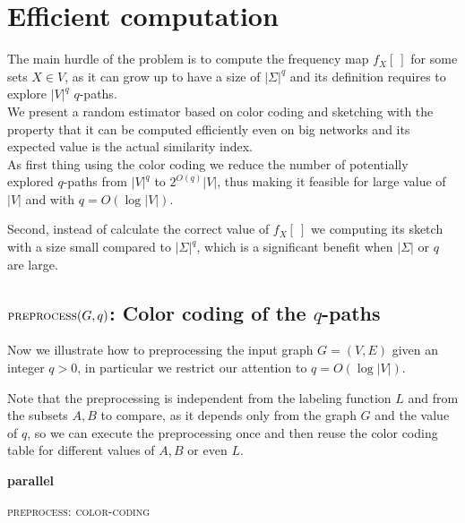 \section{Efficient computation}

The main hurdle of the problem is to compute the frequency map $f_{X}[\ ]$ for some sets $X \in V$,
as it can grow up to have a size of $|\Sigma|^{q}$ and its definition requires to explore $|V|^{q}$ $q$-paths.\\

We present a random estimator based on color coding and sketching with the property that it can be computed
efficiently even on big networks and its expected value is the actual similarity index\cite{SubSim}.\\

As first thing using the color coding we reduce the number of potentially explored $q$-paths from $|V|^{q}$ to $2^{O(q)}|V|$, 
thus making it feasible for large value of $|V|$ and with $q = O(\log |V|)$.

Second, instead of calculate the correct value of $f_{X}[\ ]$ we computing its sketch with a size small compared to $|\Sigma|^{q}$,
which is a significant benefit when $|\Sigma|$ or $q$ are large.

\subsection*{$\textsc{preprocess}(G,q)$: Color coding of the $q$-paths}

Now we illustrate how to preprocessing the input graph $G=(V,E)$ given an integer $q > 0$, in particular we restrict our attention to $q = O(\log |V|)$.

Note that the preprocessing is independent from the labeling function $L$ and from the subsets $A,B$ to compare, 
as it depends only from the graph $G$ and the value of $q$, so we can execute the preprocessing once and 
then reuse the color coding table for different values of $A,B$ or even $L$.\\

\begin{algorithm}[h]
	
	\small
	\DontPrintSemicolon
	\BlankLine
	\textbf{parallel} 
	\BlankLine
	\caption{\textsc{preprocess}: \textsc{color-coding}}
	\label{alg:color-coding}
\end{algorithm}

